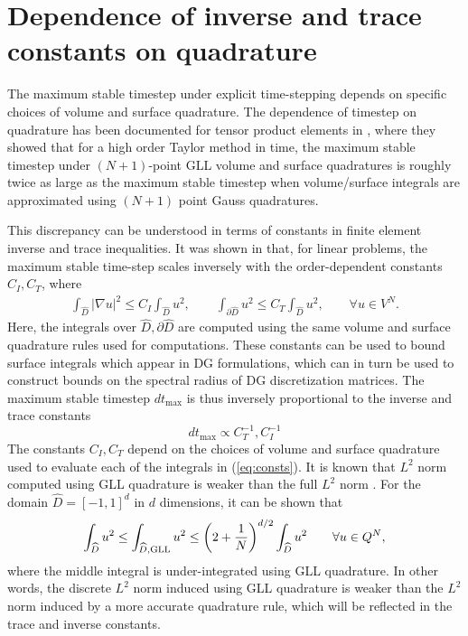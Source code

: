 \documentclass{svjour3}                     %
\renewcommand{\hat}{\widehat}
\newcommand{\LRp}[1]{\left( #1 \right)}
\newcommand{\LRb}[1]{\left| #1 \right|}
\newcommand{\Grad} {\ensuremath{\nabla}}
\begin{document}
\appendix
\section{Dependence of inverse and trace constants on quadrature}
\label{sec:consts}

The maximum stable timestep under explicit time-stepping depends on specific choices of volume and surface quadrature.  The dependence of timestep on quadrature has been documented for tensor product elements in \cite{gassner2011comparison}, where they showed that for a high order Taylor method in time, the maximum stable timestep under  $(N+1)$-point GLL volume and surface quadratures is roughly twice as large as the maximum stable timestep when volume/surface integrals are approximated using $(N+1)$ point Gauss quadratures.  

This discrepancy can be understood in terms of constants in finite element inverse and trace inequalities.  It was shown in \cite{chan2015gpu, chan2018multi} that, for linear problems, the maximum stable time-step scales inversely with the order-dependent constants $C_I, C_T$, where
\begin{align}
\int_{\hat{D}} \LRb{\Grad u}^2 \leq C_I \int_{\hat{D}} u^2, \qquad \int_{\partial \hat{D}} u^2 \leq C_T  \int_{\hat{D}} u^2, \qquad \forall u \in V^N \label{eq:consts}.
\end{align}
Here, the integrals over $\hat{D}, \partial \hat{D}$ are computed using the same volume and surface quadrature rules used for computations.  These constants can be used to bound surface integrals which appear in DG formulations, which can in turn be used to construct bounds on the spectral radius of DG discretization matrices.  The maximum stable timestep $dt_{\max}$ is thus inversely proportional to the inverse and trace constants
\[
dt_{\max} \propto C_T^{-1}, C_I^{-1}
\]
The constants $C_I, C_T$ depend on the choices of volume and surface quadrature used to evaluate each of the integrals in (\ref{eq:consts}).  It is known that $L^2$ norm computed using GLL quadrature is weaker than the full $L^2$ norm \cite{quarteroni1994introduction,canuto2007spectral}.  For the domain $\hat{D} = [-1,1]^d$ in $d$ dimensions, it can be shown that
\begin{equation}
\int_{\hat{D}} u^2 \leq \int_{\hat{D}, {\rm GLL}} u^2 \leq \LRp{2+\frac{1}{N}}^{d/2}\int_{\hat{D}} u^2 \qquad \forall u \in Q^{N},%
\label{eq:gllineq}
\end{equation}
where the middle integral is under-integrated using GLL quadrature.  In other words, the discrete $L^2$ norm induced using GLL quadrature is weaker than the $L^2$ norm induced by a more accurate quadrature rule, which will be reflected in the trace and inverse constants.  
\end{document}
